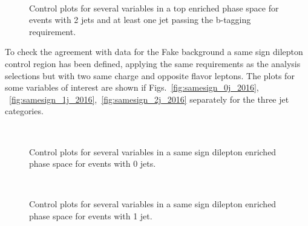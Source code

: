 \begin{figure}[!h]
\centering
{}
\\
\caption{Control plots for several variables in a top enriched phase space for events with 2 jets and at least one jet passing the b-tagging requirement.}\label{fig:top_2jet_2016}
\end{figure}


To check the agreement with data for the Fake background a same sign dilepton control region has been defined, applying the same requirements as the analysis selections but with two same charge and opposite flavor leptons. The plots for some variables of interest are shown if Figs.~\ref{fig:samesign_0j_2016}, ~\ref{fig:samesign_1j_2016},~\ref{fig:samesign_2j_2016} separately for the three jet categories.

\begin{figure}[!h]
\centering
{}
\\
\caption{Control plots for several variables in a same sign dilepton enriched phase space for events with 0 jets.}\label{fig:samesign_0jet_2016}
\end{figure}

\begin{figure}[!h]
\centering
{}
\\
\caption{Control plots for several variables in a same sign dilepton enriched phase space for events with 1 jet.}\label{fig:samesign_1jet_2016}
\end{figure}

